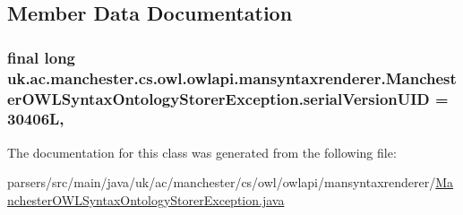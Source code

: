 \subsection{Member Data Documentation}
\hypertarget{classuk_1_1ac_1_1manchester_1_1cs_1_1owl_1_1owlapi_1_1mansyntaxrenderer_1_1_manchester_o_w_l_syntax_ontology_storer_exception_af2d878f8045db45e2dade9c0d4782c09}{
\subsubsection[{serial\-Version\-U\-I\-D}]{\setlength{\rightskip}{0pt plus 5cm}final long uk.\-ac.\-manchester.\-cs.\-owl.\-owlapi.\-mansyntaxrenderer.\-Manchester\-O\-W\-L\-Syntax\-Ontology\-Storer\-Exception.\-serial\-Version\-U\-I\-D = 30406\-L\hspace{0.3cm}{\ttfamily [static]}, {\ttfamily [private]}}}\label{classuk_1_1ac_1_1manchester_1_1cs_1_1owl_1_1owlapi_1_1mansyntaxrenderer_1_1_manchester_o_w_l_syntax_ontology_storer_exception_af2d878f8045db45e2dade9c0d4782c09}


The documentation for this class was generated from the following file\-:\begin{DoxyCompactItemize}
\item 
parsers/src/main/java/uk/ac/manchester/cs/owl/owlapi/mansyntaxrenderer/\hyperlink{_manchester_o_w_l_syntax_ontology_storer_exception_8java}{Manchester\-O\-W\-L\-Syntax\-Ontology\-Storer\-Exception.\-java}\end{DoxyCompactItemize}

